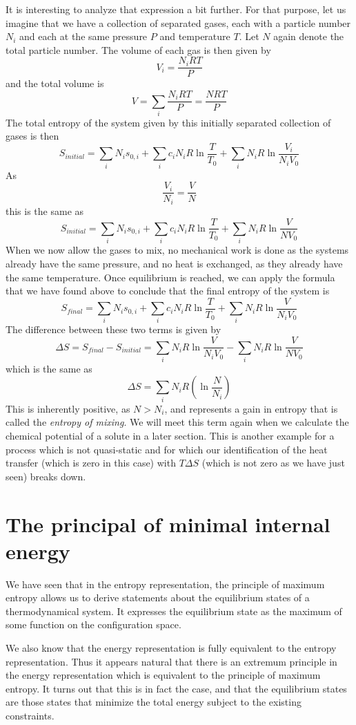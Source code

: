 \documentclass[a4paper, draft]{article}
\theoremstyle{own}
\theoremstyle{remark}
\begin{document}
It is interesting to analyze that expression a bit further. For that purpose, let us imagine that we have a collection of separated gases, each with a particle number $N_i$ and each at the same pressure $P$ and temperature $T$. Let $N$ again denote the total particle number. The volume of each gas is then given by
$$
V_i = \frac{N_i R T}{P} 
$$
and the total volume is 
$$
V = \sum_i \frac{N_i R T}{P}  = \frac{N R T}{P}
$$
The total entropy of the system given by this initially separated collection of gases is then
$$
S_{initial} = \sum_i N_i  s_{0, i} + \sum_i  c_i N_i R \ln   \frac{T}{T_0}  +  \sum_i  N_i R \ln \frac{V_i}{N_i V_0} 
$$
As
$$
\frac{V_i}{N_i} = \frac{V}{N}
$$
this is the same as
$$
S_{initial} = \sum_i N_i  s_{0, i} + \sum_i  c_i N_i R \ln   \frac{T}{T_0}  +  \sum_i  N_i R \ln \frac{V}{N V_0} 
$$
When we now allow the gases to mix, no mechanical work is done as the systems already have the same pressure, and no heat is exchanged, as they already have the same temperature. Once equilibrium is reached, we can apply the formula that we have found above to conclude that the final entropy of the system is
$$
S_{final} = \sum_i N_i  s_{0, i} + \sum_i  c_i N_i R \ln   \frac{T}{T_0}  +  \sum_i  N_i R \ln \frac{V}{N_i V_0} 
$$
The difference between these two terms is given by
$$
\Delta S = S_{final} - S_{initial} = \sum_i  N_i R \ln \frac{V}{N_i V_0}  - \sum_i  N_i R \ln \frac{V}{N V_0} 
$$
which is the same as
$$
\Delta S = \sum_i  N_i R ( \ln \frac{N}{N_i })
$$
This is inherently positive, as $N > N_i$, and represents a gain in entropy that is called the {\em entropy of mixing}. We will meet this term again when we calculate the chemical potential of a solute in a later section. This is another example for a process which is not quasi-static and for which our identification of the heat transfer (which is zero in this case) with $T \Delta S$ (which is not zero as we have just seen) breaks down. 

\section{The principal of minimal internal energy}\label{sec:minimalinternalenergy}

We have seen that in the entropy representation, the principle of maximum entropy allows us to derive statements about the equilibrium states of a thermodynamical system. It expresses the equilibrium state as the maximum of some function on the configuration space.

We also know that the energy representation is fully equivalent to the entropy representation. Thus it appears natural that there is an extremum principle in the energy representation which is equivalent to the principle of maximum entropy. It turns out that this is in fact the case, and that the equilibrium states are those states that minimize the total energy subject to the existing constraints.
\end{document}
